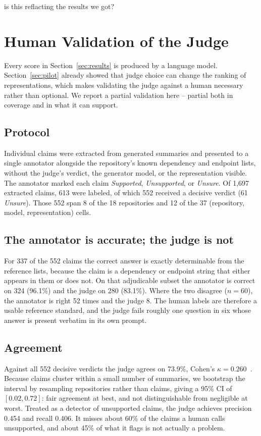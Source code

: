 is this reflacting the results we got?\documentclass[conference]{IEEEtran}
\begin{document}
\section{Human Validation of the Judge}
\label{sec:human}

Every score in Section~\ref{sec:results} is produced by a language model. Section~\ref{sec:pilot}
already showed that judge choice can change the ranking of representations, which makes
validating the judge against a human necessary rather than optional. We report a partial
validation here -- partial both in coverage and in what it can support.

\subsection{Protocol}
Individual claims were extracted from generated summaries and presented to a single annotator
alongside the repository's known dependency and endpoint lists, without the judge's verdict, the
generator model, or the representation visible. The annotator marked each claim
\emph{Supported}, \emph{Unsupported}, or \emph{Unsure}. Of 1{,}697 extracted claims, 613 were
labeled, of which 552 received a decisive verdict (61 \emph{Unsure}). Those 552 span 8 of the 18
repositories and 12 of the 37 (repository, model, representation) cells.

\subsection{The annotator is accurate; the judge is not}
For 337 of the 552 claims the correct answer is exactly determinable from the reference lists,
because the claim is a dependency or endpoint string that either appears in them or does not. On
that adjudicable subset the annotator is correct on 324 (96.1\%) and the judge on 280 (83.1\%).
Where the two disagree ($n=60$), the annotator is right 52 times and the judge 8. The human
labels are therefore a usable reference standard, and the judge fails roughly one question in
six whose answer is present verbatim in its own prompt.

\subsection{Agreement}
Against all 552 decisive verdicts the judge agrees on 73.9\%, Cohen's $\kappa =
0.260$~\cite{cohen1960coefficient}. Because claims cluster within a small number of summaries, we
bootstrap the interval by resampling repositories rather than claims, giving a 95\% CI of
$[0.02, 0.72]$: fair agreement at best, and not distinguishable from negligible at worst.
Treated as a detector of unsupported claims, the judge achieves precision 0.454 and recall
0.406. It misses about 60\% of the claims a human calls unsupported, and about 45\% of what it
flags is not actually a problem.
\end{document}
